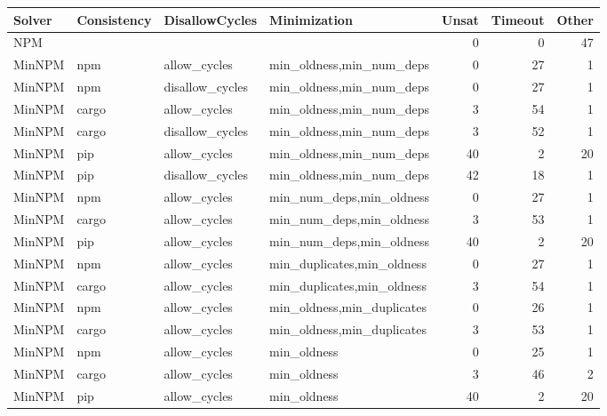 \begin{table}[ht]
\centering
\begin{tabular}{llllrrr}
  \hline
Solver & Consistency & DisallowCycles & Minimization & Unsat & Timeout & Other \\ 
  \hline
NPM &  &  &  &   0 &   0 &  47 \\ 
  MinNPM & npm & allow\_cycles & min\_oldness,min\_num\_deps &   0 &  27 &   1 \\ 
  MinNPM & npm & disallow\_cycles & min\_oldness,min\_num\_deps &   0 &  27 &   1 \\ 
  MinNPM & cargo & allow\_cycles & min\_oldness,min\_num\_deps &   3 &  54 &   1 \\ 
  MinNPM & cargo & disallow\_cycles & min\_oldness,min\_num\_deps &   3 &  52 &   1 \\ 
  MinNPM & pip & allow\_cycles & min\_oldness,min\_num\_deps &  40 &   2 &  20 \\ 
  MinNPM & pip & disallow\_cycles & min\_oldness,min\_num\_deps &  42 &  18 &   1 \\ 
  MinNPM & npm & allow\_cycles & min\_num\_deps,min\_oldness &   0 &  27 &   1 \\ 
  MinNPM & cargo & allow\_cycles & min\_num\_deps,min\_oldness &   3 &  53 &   1 \\ 
  MinNPM & pip & allow\_cycles & min\_num\_deps,min\_oldness &  40 &   2 &  20 \\ 
  MinNPM & npm & allow\_cycles & min\_duplicates,min\_oldness &   0 &  27 &   1 \\ 
  MinNPM & cargo & allow\_cycles & min\_duplicates,min\_oldness &   3 &  54 &   1 \\ 
  MinNPM & npm & allow\_cycles & min\_oldness,min\_duplicates &   0 &  26 &   1 \\ 
  MinNPM & cargo & allow\_cycles & min\_oldness,min\_duplicates &   3 &  53 &   1 \\ 
  MinNPM & npm & allow\_cycles & min\_oldness &   0 &  25 &   1 \\ 
  MinNPM & cargo & allow\_cycles & min\_oldness &   3 &  46 &   2 \\ 
  MinNPM & pip & allow\_cycles & min\_oldness &  40 &   2 &  20 \\ 
   \hline
\end{tabular}
\end{table}

